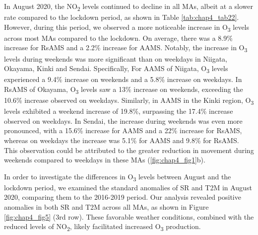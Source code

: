 In August 2020, the NO\textsubscript{2} levels continued to decline in all MAs, albeit at a slower rate compared to the lockdown period, as shown in Table \ref{tab:chap4_tab22}. However, during this period, we observed a more noticeable increase in O\textsubscript{3} levels across most MAs compared to the lockdown. On average, there was a 8.9\% increase for RsAMS and a 2.2\% increase for AAMS. Notably, the increase in O\textsubscript{3} levels during weekends was more significant than on weekdays in Niigata, Okayama, Kinki and Sendai. Specifically, For AAMS of Niigata, O\textsubscript{3} levels experienced a 9.4\% increase on weekends and a 5.8\% increase on weekdays. In RsAMS of Okayama, O\textsubscript{3} levels saw a 13\% increase on weekends, exceeding the 10.6\% increase observed on weekdays. Similarly, in AAMS in the Kinki region, O\textsubscript{3} levels exhibited a weekend increase of 19.8\%, surpassing the 17.4\% increase observed on weekdays. In Sendai, the increase during weekends was even more pronounced, with a 15.6\% increase for AAMS and a 22\% increase for RsAMS, whereas on weekdays the increase was 5.1\% for AAMS and 9.8\% for RsAMS. This observation could be attributed to the greater reduction in movement during weekends compared to weekdays in these MAs (\ref{fig:chap4_fig1}b). \par
In order to investigate the differences in O\textsubscript{3} levels between August and the lockdown period, we examined the standard anomalies of SR and T2M in August 2020, comparing them to the 2016-2019 period. Our analysis revealed positive anomalies in both SR and T2M across all MAs, as shown in Figure \ref{fig:chap4_fig5} (3rd row). These favorable weather conditions, combined with the reduced levels of NO\textsubscript{2}, likely facilitated increased O\textsubscript{3} production. \par

